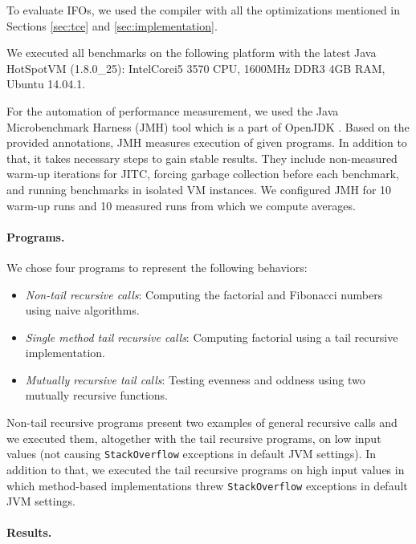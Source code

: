 \noindent To evaluate IFOs, we used the \name compiler with all the
optimizations mentioned in Sections \ref{sec:tce} and
\ref{sec:implementation}.

\noindent We executed all benchmarks on the following platform with
the latest Java HotSpot\texttrademark VM (1.8.0\_25):
Intel\textregistered Core\texttrademark i5 3570 CPU, 1600MHz DDR3 4GB
RAM, Ubuntu 14.04.1.
  
\noindent For the automation of performance measurement, we used the
Java Microbenchmark Harness (JMH) tool which is a part of OpenJDK
\cite{jmh}. Based on the provided annotations, JMH measures execution
of given programs. In addition to that, it takes necessary steps to
gain stable results. They include non-measured warm-up iterations for
JITC, forcing garbage collection before each benchmark, and running
benchmarks in isolated VM instances. We configured JMH for 10 warm-up
runs and 10 measured runs from which we compute averages.

\paragraph{Programs.}

We chose four programs to represent the following behaviors:

\begin{itemize}

  \item \emph{Non-tail recursive calls}: Computing the factorial and
    Fibonacci numbers using naive algorithms.

  \item \emph{Single method tail recursive calls}: Computing factorial
    using a tail recursive implementation.

  \item \emph{Mutually recursive tail calls}: Testing evenness and
    oddness using two mutually recursive functions.
\end{itemize}

\noindent Non-tail recursive programs present two examples of general
recursive calls and we executed them, altogether with the tail
recursive programs, on low input values (not causing
\lstinline{StackOverflow} exceptions in default JVM settings). In
addition to that, we executed the tail recursive programs on high input
values in which method-based implementations threw
\lstinline{StackOverflow} exceptions in default JVM settings.
  
\paragraph{Results.}

